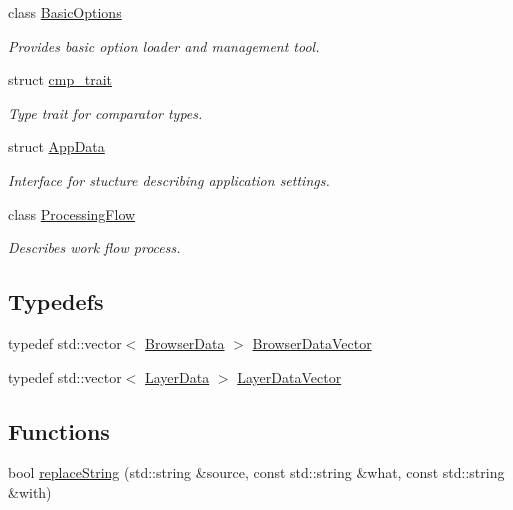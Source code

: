 \begin{DoxyCompactItemize}
class \hyperlink{classwpc_1_1_basic_options}{Basic\-Options}
\begin{DoxyCompactList}\small\item\em Provides basic option loader and management tool. \end{DoxyCompactList}\item 
struct \hyperlink{structwpc_1_1cmp__trait}{cmp\-\_\-trait}
\begin{DoxyCompactList}\small\item\em Type trait for comparator types. \end{DoxyCompactList}\item 
struct \hyperlink{structwpc_1_1_app_data}{App\-Data}
\begin{DoxyCompactList}\small\item\em Interface for stucture describing application settings. \end{DoxyCompactList}\item 
class \hyperlink{classwpc_1_1_processing_flow}{Processing\-Flow}
\begin{DoxyCompactList}\small\item\em Describes work flow process. \end{DoxyCompactList}\end{DoxyCompactItemize}
\subsection*{Typedefs}
\begin{DoxyCompactItemize}
\item 
typedef std\-::vector$<$ \hyperlink{structwpc_1_1_browser_data}{Browser\-Data} $>$ \hyperlink{namespacewpc_a558cfa552932b524c346cce3b726ad61}{Browser\-Data\-Vector}
\item 
typedef std\-::vector$<$ \hyperlink{structwpc_1_1_layer_data}{Layer\-Data} $>$ \hyperlink{namespacewpc_a778a3f9b2be5b4dd228ea2c752dc7aa2}{Layer\-Data\-Vector}
\end{DoxyCompactItemize}
\subsection*{Functions}
\begin{DoxyCompactItemize}
\item 
bool \hyperlink{namespacewpc_a0cc8f693f53c4b1b747da533c6f2a831}{replace\-String} (std\-::string \&source, const std\-::string \&what, const std\-::string \&with)
\end{DoxyCompactItemize}


